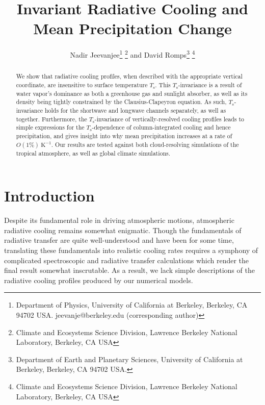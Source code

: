 \documentclass[10pt]{article}
\newcommand{\Ts}{\ensuremath{T_\mathrm{s}}}
\newcommand{\Kinverse}{\ensuremath{\mathrm{K^{-1}}}}
\begin{document}
%
%


\title{Invariant Radiative Cooling and Mean Precipitation Change}

%
%


 \author{Nadir Jeevanjee\footnote{Department of Physics, University of California at Berkeley, Berkeley, CA 94702  USA. jeevanje@berkeley.edu (corresponding author)} \footnote{Climate and Ecosystems Science Division, Lawrence Berkeley National Laboratory, Berkeley, CA USA} and David Romps\footnote{Department of Earth and Planetary Sciences, University of California at Berkeley, Berkeley, CA 94702  USA.} \footnote{Climate and Ecosystems Science Division, Lawrence Berkeley National Laboratory, Berkeley, CA USA}
}

\maketitle

\begin{abstract}
We show that radiative cooling profiles, when described with the appropriate vertical coordinate, are insensitive to surface temperature \Ts. This \Ts-invariance is a result of water vapor's dominance as both a greenhouse gas and sunlight absorber, as well as its density being tightly constrained by the Clausius-Clapeyron equation. As such, \Ts-invariance holds for the shortwave and longwave channels separately, as well as together. Furthermore, the \Ts-invariance of vertically-resolved cooling profiles leads to simple expressions for the \Ts-dependence of column-integrated cooling and hence precipitation, and gives insight into why mean precipitation increases at a rate of $O(1\%)\ \Kinverse$.  Our results are tested against both cloud-resolving simulations of the tropical atmosphere, as well as global climate simulations.
%
%
\end{abstract}


%
%


\section {Introduction}
Despite its fundamental role in driving atmospheric motions, atmospheric radiative cooling remains somewhat enigmatic. Though the fundamentals of radiative transfer are quite well-understood and have been for some time, translating these fundamentals into realistic cooling rates requires a symphony of complicated spectroscopic and radiative transfer calculations which render the final result somewhat inscrutable. As a result, we lack simple descriptions of the radiative cooling profiles produced by our numerical models.
\end{document}
